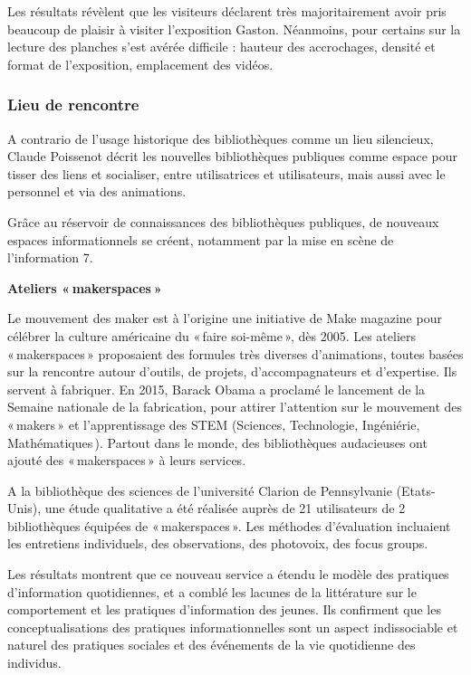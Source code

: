 \documentclass[french,a4paper,12pt]{article}
\begin{document}
Les résultats révèlent que les visiteurs déclarent très majoritairement avoir pris beaucoup de plaisir à visiter l’exposition Gaston. Néanmoins, pour certains sur la lecture des planches s'est avérée difficile : hauteur des accrochages, densité et format de l’exposition, emplacement des vidéos.  

\subsubsection{Lieu de rencontre}

\quad A contrario de l’usage historique des bibliothèques comme un lieu silencieux, Claude Poissenot  décrit les nouvelles bibliothèques publiques comme espace pour tisser des liens et socialiser, entre utilisatrices et utilisateurs, mais aussi avec le personnel et via des animations. 

Grâce au réservoir de connaissances des bibliothèques publiques, de nouveaux espaces informationnels se créent, notamment par la mise en scène de l’information 7. 

\textbf{Ateliers « makerspaces »}

\quad Le mouvement des maker est à l’origine une initiative de Make magazine pour célébrer la culture américaine du « faire soi-même », dès 2005. Les ateliers « makerspaces » proposaient des formules très diverses d’animations, toutes basées sur la rencontre autour d’outils, de projets, d’accompagnateurs et d’expertise. Ils servent à fabriquer. En 2015, Barack Obama a proclamé le lancement de la Semaine nationale de la fabrication, pour attirer l’attention sur le mouvement des « makers » et l’apprentissage des STEM (Sciences, Technologie, Ingéniérie, Mathématiques ). Partout dans le monde, des bibliothèques audacieuses ont ajouté des « makerspaces » à leurs services. 

A la bibliothèque des sciences de l’université Clarion de Pennsylvanie (Etats-Unis), une étude qualitative a été réalisée auprès de 21 utilisateurs de 2 bibliothèques équipées de « makerspaces ». Les méthodes d’évaluation incluaient les entretiens individuels, des observations, des photovoix, des focus groups. 

Les résultats montrent que ce nouveau service a étendu le modèle des pratiques d'information quotidiennes, et a comblé les lacunes de la littérature sur le comportement et les pratiques d'information des jeunes. Ils confirment que les conceptualisations des pratiques informationnelles sont un aspect indissociable et naturel des pratiques sociales et des événements de la vie quotidienne des individus. 
\end{document}
